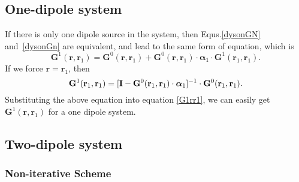 \subsection{One-dipole system}

If there is only one dipole source in the system, then Equs.\eqref{dysonGN} and~\eqref{dysonGn} are equivalent, and lead to the same form of equation, which is
\begin{equation}
\label{G1rr1}
 \mathbf{G}^1(\mathbf{r},\mathbf{r}_1)=\mathbf{G}^{0}(\mathbf{r},\mathbf{r}_1)+{\mathbf{G}^{0}(\mathbf{r},\mathbf{r}_1)\cdot {\bm \alpha}_1 \cdot \mathbf{G}^1(\mathbf{r}_1,\mathbf{r}_1)}.
\end{equation}
If we force $\mathbf{r}=\mathbf{r}_1$, then
\begin{equation}
\label{G1r1r1}
 \mathbf{G}^1(\mathbf{r}_1,\mathbf{r}_1)=[\mathbf{I}-\mathbf{G}^{0}(\mathbf{r}_1,\mathbf{r}_1)\cdot {\bm \alpha}_1 ]^{-1}\cdot \mathbf{G}^{0}(\mathbf{r}_1,\mathbf{r}_1).
\end{equation}
Substituting the above equation into equation \ref{G1rr1}, we can easily get $ \mathbf{G}^1(\mathbf{r},\mathbf{r}_1)$ for a one dipole system.

\subsection{Two-dipole system}
\subsubsection{Non-iterative Scheme}\label{section:noniterativeGF}

